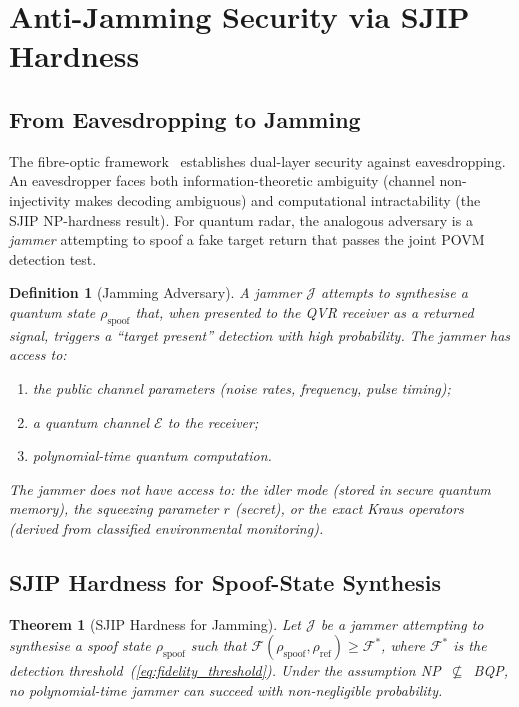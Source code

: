 \documentclass[journal]{IEEEtran}
\newtheorem{theorem}{Theorem}
\newtheorem{definition}{Definition}
\begin{document}
\section{Anti-Jamming Security via SJIP Hardness}\label{sec:security}

\subsection{From Eavesdropping to Jamming}

The fibre-optic framework~\cite{gautum2024rigorous} establishes dual-layer security against eavesdropping. An eavesdropper faces both information-theoretic ambiguity (channel non-injectivity makes decoding ambiguous) and computational intractability (the SJIP NP-hardness result). For quantum radar, the analogous adversary is a \textit{jammer} attempting to spoof a fake target return that passes the joint POVM detection test.

\begin{definition}[Jamming Adversary]\label{def:jammer}
A jammer $\mathcal{J}$ attempts to synthesise a quantum state $\rho_{\text{spoof}}$ that, when presented to the QVR receiver as a returned signal, triggers a ``target present'' detection with high probability. The jammer has access to:
\begin{enumerate}
    \item[(i)] the public channel parameters (noise rates, frequency, pulse timing);
    \item[(ii)] a quantum channel $\mathcal{E}$ to the receiver;
    \item[(iii)] polynomial-time quantum computation.
\end{enumerate}
The jammer does \textit{not} have access to: the idler mode (stored in secure quantum memory), the squeezing parameter $r$ (secret), or the exact Kraus operators (derived from classified environmental monitoring).
\end{definition}

\subsection{SJIP Hardness for Spoof-State Synthesis}

\begin{theorem}[SJIP Hardness for Jamming]\label{thm:sjip_jamming}
Let $\mathcal{J}$ be a jammer attempting to synthesise a spoof state $\rho_{\text{spoof}}$ such that $\mathcal{F}(\rho_{\text{spoof}}, \rho_{\text{ref}}) \geq \mathcal{F}^{*}$, where $\mathcal{F}^{*}$ is the detection threshold~(\ref{eq:fidelity_threshold}). Under the assumption NP~$\not\subseteq$~BQP, no polynomial-time jammer can succeed with non-negligible probability.
\end{theorem}
\end{document}

